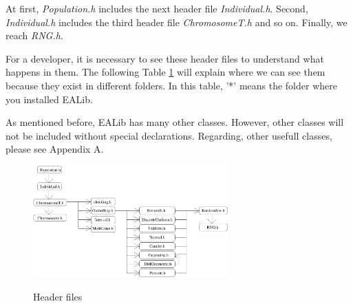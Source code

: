\documentclass[twocolumn]{article}
\begin{document}
\noindent
At first, {\em Population.h} includes the next header file {\em
Individual.h}. Second, {\em Individual.h} includes the third header
file {\em ChromosomeT.h} and so on. Finally, we reach {\em RNG.h}. 

\noindent
For a developer, it is necessary to see these header files to
understand what happens in them. The following Table \ref{Header} will
explain where we can see them because they exist in different
folders. In this table, '*' means the folder where you installed EALib.

\noindent
As mentioned before, EALib has many other classes. However,
other classes will not be included without special
declarations. Regarding, other usefull classes, please see Appendix
A.


\begin{figure}[h]
\begin{center}
\includegraphics[width=7.5cm]{EALib-1.eps}\\
\caption{Header files}
\label{Header}
\end{center}
\end{figure}
\end{document}
